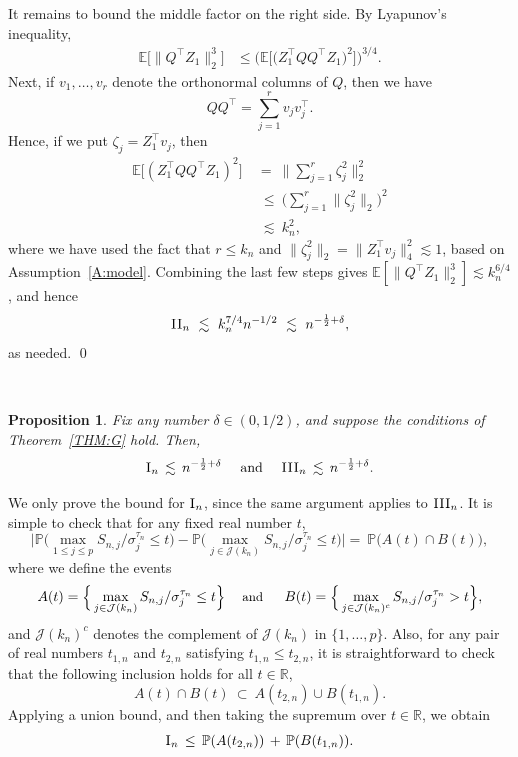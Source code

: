 \documentclass[aos,preprint]{imsart}
\numberwithin{equation}{section}
\theoremstyle{plain}
\newtheorem{proposition}{Proposition}[section]
\newcommand{\R}{\mathbb{R}}
\newcommand{\I}{\textsc{I}}
\newcommand{\II}{\textsc{II}}
\newcommand{\III}{\textsc{III}}
\newcommand{\J}{\mathcal{J}}
\renewcommand{\P}{\mathbb{P}}
\newcommand{\E}{\mathbb{E}}
\newcommand{\ttop}{^{\top}}
\newcommand{\tsum}{\textstyle\sum}
\newcommand{\1}{{\bf{1}}}
\newcommand{\0}{\mathbf{0}}
\begin{document}
It remains to bound the middle factor on the right side. By Lyapunov's inequality, 
%
\begin{equation}\label{eqn:fourthcalc}
\begin{split}
\E\big[\|Q\ttop Z_1\|_2^3\big] &\leq \Big(\E\Big[\big(Z_1\ttop QQ\ttop Z_1\big)^2\Big]\Big)^{3/4}.
%
\end{split}
\end{equation} 
Next, if $v_1,\dots,v_r$ denote the orthonormal columns of $Q$, then we have
$$QQ\ttop = \tsum_{j=1}^r v_jv_j\ttop.$$
Hence, if we put $\zeta_j=Z_1\ttop v_j$, then
\begin{equation}
\begin{split}
 \E\Big[(Z_1\ttop QQ\ttop Z_1)^2\Big] \ &= \ \Big\|\tsum_{j=1}^r \zeta_j^2\Big\|_2^2\\[0.2cm]
 & \ \leq \ \Big(\tsum_{j=1}^r \|\zeta_j^2\|_2\Big)^2\\[0.2cm]
 & \ \lesssim \ k_n^2,
 \end{split}
\end{equation}
where we have used the fact that $r\leq k_n$ and $\|\zeta_j^2\|_2=\|Z_1\ttop v_j\|_4^2\lesssim 1$, based on Assumption~\ref{A:model}.
Combining the last few steps gives $\E[\|Q\ttop Z_1\|_2^3]\lesssim k_n^{6/4}$, and hence
$$ \II_n  \ \lesssim \ k_n^{7/4}n^{-1/2}\ \lesssim \ n^{-\frac 12+\delta},$$
as needed.
\qed 

~\\

\begin{proposition}\label{prop:IandIII}
Fix any number $\delta\in(0,1/2)$, and suppose the conditions of Theorem~\ref{THM:G} hold. Then, 
\begin{equation}\label{IandIII}
\I_n \, \lesssim \, n^{-\frac 12+\delta} \ \ \ \text{ and } \ \ \ \III_n \, \lesssim \, n^{-\frac 12+\delta}.
\end{equation}
\end{proposition}
\proof We only prove the bound for $\I_n$, since the same argument applies to $\III_n$.
%
It is simple to check that for any fixed real number $t$,
$$\Big|\P\Big(\max_{1\leq j\leq p} S_{n,j}/\sigma_j^{\tau_n} \leq t\Big)-\P\Big(\max_{j\in\J(k_n)} S_{n,j}/\sigma_j^{\tau_n} \leq t\Big)\Big| = \ \P\Big(A(t)\cap B(t)\Big),$$
where we define the events
\begin{equation}\label{inclusion}
\small
A(t)=\Big\{\max_{j\in\J(k_n)} S_{n,j}/\sigma_j^{\tau_n} \leq t\Big\} \ \ \ \text{ and } \ \  \ \ B(t)=\Big\{\max_{j\in\J(k_n)^c} S_{n,j}/\sigma_j^{\tau_n}> t\Big\},
\end{equation}
and $\J(k_n)^c$ denotes the complement of $\J(k_n)$ in $\{1,\dots,p\}$.
Also, for any pair of real numbers $t_{1,n}$ and $t_{2,n}$ satisfying $t_{1,n}\leq t_{2,n}$, it is straightforward to check that the following inclusion holds for all $t\in\R$,
\begin{equation}\label{inclusion}
A(t)\cap B(t) \ \subset \ A(t_{2,n})\cup B(t_{1,n}).
\end{equation}
%
Applying a union bound, and then taking the supremum over $t\in\R$, we obtain
$$\I_n\,\leq \, \P(A(t_{2,n}))\,+\, \P(B(t_{1,n})).$$
\end{document}
